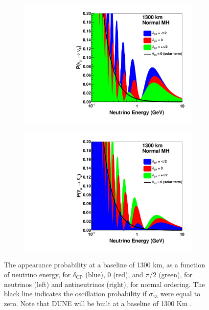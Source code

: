 \begin{figure}[t]
     \centering
     \begin{subfigure}[b]{0.48\textwidth}
         \centering
         \includegraphics[width=\textwidth]{figures/ch3-DUNE/energy_nu_no.pdf}
         \caption{}
         \label{fig:energy_nu_no}
     \end{subfigure}
     \hfill
     \begin{subfigure}[b]{0.48\textwidth}
         \centering
         \includegraphics[width=\textwidth]{figures/ch3-DUNE/energy_anu_no.pdf}
         \caption{}
         \label{fig:energy_anu_no}
     \end{subfigure}
        \caption[Appearance probability as a function of neutrino energy.]{The appearance probability at a baseline of 1300 km, as a function of neutrino energy, for $\delta_\text{CP}$ (blue), 0 (red), and $\pi/2$ (green), for neutrinos (left) and antineutrinos (right), for normal ordering. The black line indicates the oscillation probability if $\sigma_{13}$ were equal to zero. Note that DUNE will be built at a baseline of 1300 Km \cite{DUNE:2020TDR1}. }
        \label{fig:energy_nu}
\end{figure}


